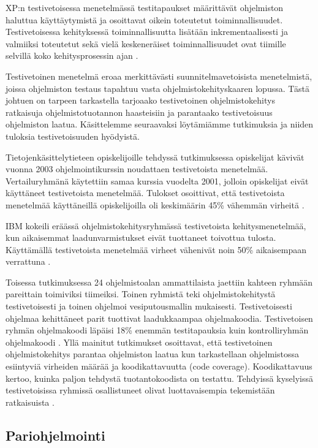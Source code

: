 \documentclass[finnish]{tktltiki2}
\theoremstyle{definition}
\theoremstyle{remark}
\begin{document}
XP:n testivetoisessa menetelmässä testitapaukset määrittävät ohjelmiston haluttua käyttäytymistä ja osoittavat oikein toteutetut toiminnallisuudet. Testivetoisessa kehityksessä toiminnallisuutta lisätään inkrementaalisesti ja valmiiksi toteutetut sekä vielä keskeneräiset toiminnallisuudet ovat tiimille selvillä koko kehitysprosessin ajan \cite{EDW03}.

Testivetoinen menetelmä eroaa merkittävästi suunnitelmavetoisista menetel\-mistä, joissa ohjelmiston testaus tapahtuu vasta ohjelmistokehityskaaren lopussa. Tästä johtuen on tarpeen tarkastella tarjoaako testivetoinen ohjelmistokehitys ratkaisuja ohjelmistotuotannon haasteisiin ja parantaako testivetoisuus ohjelmiston laatua. Käsittelemme seuraavaksi löytämiämme tutkimuksia ja niiden tuloksia testivetoisuuden hyödyistä.

Tietojen\-käsittely\-tieteen opiskelijoille tehdyssä tutkimuksessa opiskelijat kävivät vuonna 2003 ohjelmointikurssin noudattaen testivetoista menetelmää. Vertailuryhmänä käytettiin samaa kurssia vuodelta 2001, jolloin opiskelijat eivät käyttäneet testivetoista menetelmää. Tulokset osoittivat, että testivetoista menetelmää käyttäneillä opiskelijoilla oli keskimäärin 45\% vähemmän virheitä \cite{EDW03}.

IBM kokeili eräässä ohjelmistokehitysryhmässä testivetoista kehitys\-menetelmää, kun aikaisemmat laadunvarmistukset eivät tuottaneet toivottua tulosta. Käyttä\-mällä testivetoista menetelmää virheet vähenivät noin 50\% aikaisempaan verrattuna \cite{MAW03}.

Toisessa tutkimuksessa 24 ohjelmistoalan ammattilaista jaettiin kahteen ryhmään pareittain toimiviksi tiimeiksi. Toinen ryhmistä teki ohjelmistokehitystä testivetoisesti ja toinen ohjelmoi vesiputousmallin mukaisesti. Testivetoisesti ohjelmaa kehittäneet parit tuottivat laadukkaampaa ohjelmakoodia. Testivetoisen ryhmän ohjelmakoodi läpäisi 18\% enemmän testitapauksia kuin kontrolliryhmän ohjelmakoodi \cite{GEW03}.
Yllä mainitut tutkimukset osoittavat, että testivetoinen ohjelmistokehitys parantaa ohjelmiston laatua kun tarkastellaan ohjelmistossa esiintyviä virheiden määrää ja koodikattavuutta (code coverage). Koodikattavuus kertoo, kuinka paljon tehdystä tuotantokoodista on testattu. Tehdyissä kyselyissä testivetoisissa ryhmissä osallistuneet olivat luottavaisempia tekemistään ratkaisuista \cite{GEW03}.

\subsection{Pariohjelmointi}
\end{document}
